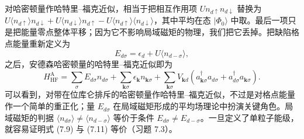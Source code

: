 对哈密顿量作哈特里–福克近似，相当于把相互作用项 $Un_{d\uparrow}n_{d\downarrow}$ 替换为 $U\langle n_{d\uparrow}\rangle n_{d\downarrow}+U\langle n_{d\downarrow}\rangle n_{d\uparrow}-U\langle n_{d\uparrow}\rangle\langle n_{d\downarrow}\rangle$，其中平均在态 $|\Phi_{0}\rangle$ 中取。最后一项只是把能量零点整体平移；因为它不影响局域磁矩的物理，我们把它丢掉。把缺陷格点能量重新定义为
\begin{equation*}
E_{d\sigma}=\epsilon_{d}+U\langle n_{d-\sigma}\rangle,\tag{7.10}
\end{equation*}
之后，安德森哈密顿量的哈特里–福克近似即为
\begin{equation*}
H_{\mathrm{HF}}^{\mathrm{A}}=\sum_{\sigma}E_{d\sigma}n_{d\sigma}+\sum_{\mathbf{k}\sigma}\epsilon_{\mathbf{k}}n_{\mathbf{k}\sigma}+\sum_{\mathbf{k}\sigma}V_{\mathbf{k}d}\left(a_{\mathbf{k}\sigma}^{\dagger}a_{d\sigma}+a_{d\sigma}^{\dagger}a_{\mathbf{k}\sigma}\right).\tag{7.11}
\end{equation*}
可以看到，对带在位库仑排斥的哈密顿量作哈特里–福克近似，不过是对格点能量作一个简单的重正化；量 $E_{d\sigma}$ 在局域磁矩形成的平均场理论中扮演关键角色。局域磁矩的判据 $\langle n_{d\sigma}\rangle\neq\langle n_{d-\sigma}\rangle$ 等价于条件 $E_{d\sigma}\neq E_{d-\sigma}$。一旦定义了单粒子能级，就容易证明式 (7.9) 与 (7.11) 等价（习题 7.3）。


